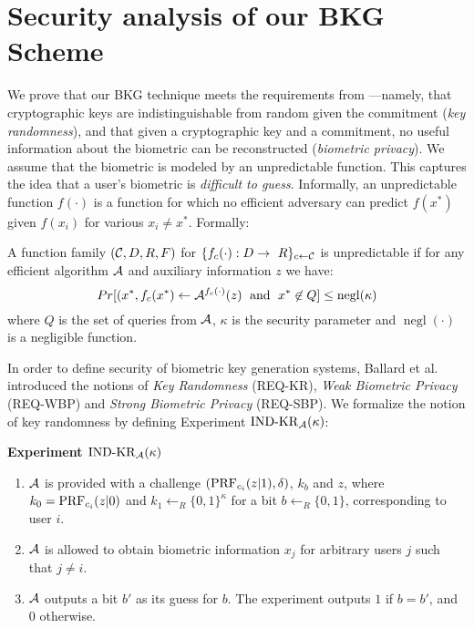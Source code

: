 %
\newpage
\appendices


\section{Security analysis of our BKG Scheme}
\label{sec:security}
%

%

We prove that our BKG technique meets the requirements from \cite{bal08}---namely, that 
cryptographic keys are indistinguishable from random 
given the commitment ({\em key randomness}), and that given a cryptographic key and a commitment, no 
useful information about the biometric can be reconstructed ({\em biometric privacy}).
We assume that the biometric is modeled by an unpredictable function. This captures the idea 
that a user's biometric is {\em difficult to guess}. Informally, an 
unpredictable function $f(\cdot)$ is a function for which no efficient adversary 
can predict $f(x^*)$ given $f(x_i)$ for various $x_i \neq x^*$. Formally:

\begin{definition}
A function family $(\mathcal{C}, D, R, F)$ for $\{f_c(\cdot): D \rightarrow~R\}_{c \leftarrow \mathcal{C}}$ is unpredictable if for any efficient algorithm $\mathcal{A}$ and auxiliary information $z$ we have:
\[
	Pr[(x^*, f_c(x^*) \leftarrow \mathcal{A}^{f_c(\cdot)}(z) \text{\; and\; } x^* \not\in Q] \leq \operatorname{negl}(\kappa)
\]
where $Q$ is the set of queries from $\mathcal{A}$, $\kappa$ is the security parameter and $\operatorname{negl}(\cdot)$ is a negligible function.
\label{def:unpredictable}
\end{definition}

In order to define security of biometric key generation systems, Ballard et al.~\cite{bal08} introduced the notions of \emph{Key Randomness} (REQ-KR), \emph{Weak Biometric Privacy} (REQ-WBP) and \emph{Strong Biometric Privacy} (REQ-SBP). 
%
%
We formalize the notion of key randomness by defining Experiment $\operatorname{IND-KR}_\mathcal{A}(\kappa)$:

\medskip
\noindent 
{\bf Experiment $\operatorname{IND-KR}_\mathcal{A}(\kappa)$} 

\smallskip
\begin{enumerate}
	\item $\mathcal{A}$ is provided with a challenge $(\operatorname{PRF}_{c_i}(z|1), \delta)$, $k_b$ and $z$, where $k_0 = \operatorname{PRF}_{c_i}(z|0)$ and $k_1 \leftarrow_R \{0,1\}^\kappa$ for a bit $b \leftarrow_R \{0,1\}$, corresponding to user $i$.
	\item $\mathcal{A}$ is allowed to obtain biometric information $x_j$ for arbitrary users $j$ such that $j\neq i$.
	\item $\mathcal{A}$ outputs a bit $b'$ as its guess for $b$. The experiment outputs $1$ if $b = b'$, and $0$ otherwise. 
\end{enumerate}


